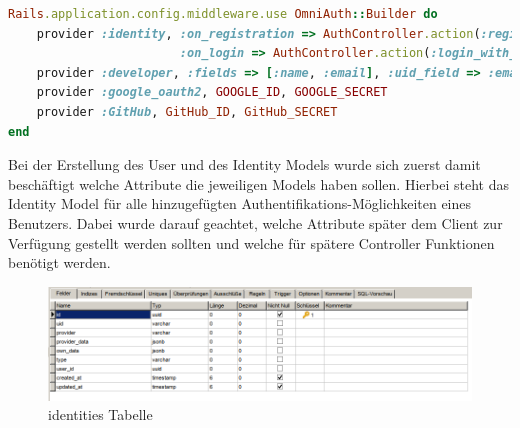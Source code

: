 \documentclass[paper=a4,fontsize=12pt,parskip=half]{scrartcl}
\begin{document}
	\begin{lstlisting}[language=Ruby, style=CodeView, caption=Zu Omniauth hinzugefügte Provider, captionpos=b, label={lst:added_providers}]
Rails.application.config.middleware.use OmniAuth::Builder do
	provider :identity, :on_registration => AuthController.action(:register),
						:on_login => AuthController.action(:login_with_password), :model => PasswordIdentity
	provider :developer, :fields => [:name, :email], :uid_field => :email unless Rails.env.production?
	provider :google_oauth2, GOOGLE_ID, GOOGLE_SECRET
	provider :GitHub, GitHub_ID, GitHub_SECRET
end
	\end{lstlisting}

	Bei der Erstellung des User und des Identity Models wurde sich zuerst damit beschäftigt welche Attribute die jeweiligen Models haben sollen. Hierbei steht das Identity Model für alle hinzugefügten Authentifikations-Möglichkeiten eines Benutzers. Dabei wurde darauf geachtet, welche Attribute später dem Client zur Verfügung gestellt werden sollten und welche für spätere Controller Funktionen benötigt werden.

	\begin{figure}[h]
		\includegraphics[width=\textwidth]{images/identities_table.png}
		\caption{identities Tabelle}
		\label{fig:identities_table}
	\end{figure}
\end{document}
